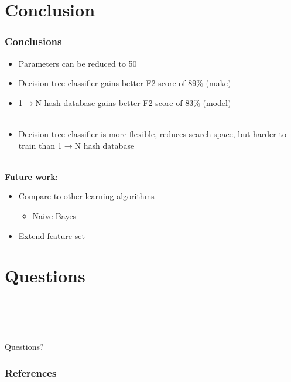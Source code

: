 \documentclass[10pt]{beamer}
\begin{document}
\section{Conclusion}
\begin{frame}
\frametitle{Conclusions}
\begin{itemize}
\item Parameters can be reduced to 50
\item Decision tree classifier gains better F2-score of 89\% (make)
\item 1$\rightarrow$N hash database gains better F2-score of 83\% (model)\\~\\
\item Decision tree classifier is more flexible, reduces search space, but harder to train than 1$\rightarrow$N hash database
\end{itemize}
~\\\textbf{Future work}:
\begin{itemize}
\item Compare to other learning algorithms
\begin{itemize}
\item Naive Bayes
\end{itemize}
\item Extend feature set
\end{itemize}
\end{frame}

\section[Questions]{Questions}
\begin{frame}
~ \\~ \\~ \\
\begin{center}\Huge Questions? \end{center} 
\end{frame}

\begin{frame}[allowframebreaks]
        \frametitle{References}
        
        
\end{frame}
\end{document}
